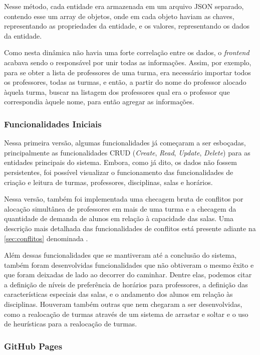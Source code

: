 Nesse método, cada entidade era armazenada em um arquivo JSON separado, contendo esse um array de objetos, onde em cada objeto haviam as chaves, representando as propriedades da entidade, e os valores, representando os dados da entidade.

Como nesta dinâmica não havia uma forte correlação entre os dados, o \textit{frontend} acabava sendo o responsável por unir todas as informações. Assim, por exemplo, para se obter a lista de professores de uma turma, era necessário importar todos os professores, todas as turmas, e então, a partir do nome do professor alocado àquela turma, buscar na listagem dos professores qual era o professor que correspondia àquele nome, para então agregar as informações.

\subsubsection{Funcionalidades Iniciais}

Nessa primeira versão, algumas funcionalidades já começaram a ser esboçadas, principalmente as funcionalidades CRUD (\textit{Create}, \textit{Read}, \textit{Update}, \textit{Delete}) para as entidades principais do sistema. Embora, como já dito, os dados não fossem persistentes, foi possível visualizar o funcionamento das funcionalidades de criação e leitura de turmas, professores, disciplinas, salas e horários.

Nessa versão, também foi implementada uma checagem bruta de conflitos por alocação simultânea de professores em mais de uma turma e a checagem da quantidade de demanda de alunos em relação à capacidade das salas. Uma descrição mais detalhada das funcionalidades de conflitos está presente adiante na \autoref{sec:conflitos} denominada .

Além dessas funcionalidades que se mantiveram até a conclusão do sistema, também foram desenvolvidas funcionalidades que não obtiveram o mesmo êxito e que foram deixadas de lado ao decorrer do caminhar. Dentre elas, podemos citar a definição de níveis de preferência de horários para professores, a definição das características especiais das salas, e o andamento dos alunos em relação às disciplinas. Houveram também outras que nem chegaram a ser desenvolvidas, como a realocação de turmas através de um sistema de arrastar e soltar e o uso de heurísticas para a realocação de turmas.

\subsubsection{GitHub Pages}

